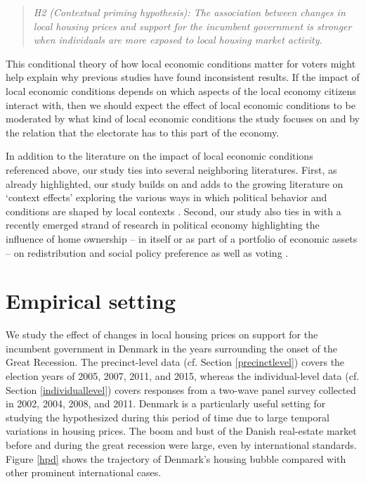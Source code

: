 \documentclass[12pt,a4paper]{article}
\begin{document}
	\newcommand{\htwo}{the contextual priming hypothesis}
	
	\begin{quote}
		\textit{H2 (Contextual priming hypothesis): The association between changes in local housing prices and support for the incumbent government is stronger when individuals are more exposed to local housing market activity.}
	\end{quote}
	
	This conditional theory of how local economic conditions matter for voters might help explain why previous studies have found inconsistent results. If the impact of local economic conditions depends on which aspects of the local economy citizens interact with, then we should expect the effect of local economic conditions to be moderated by what kind of local economic conditions the study focuses on and by the relation that the electorate has to this part of the economy.
	
	In addition to the literature on the impact of local economic conditions referenced above, our study ties into several neighboring literatures. First, as already highlighted, our study builds on and adds to the growing literature on `context effects' exploring the various ways in which political behavior and conditions are shaped by local contexts \citep[e.g.,][]{hopkins2010politicized,enos2016demolition}. Second, our study also ties in with a recently emerged strand of research in political economy highlighting the influence of home ownership -- in itself or as part of a portfolio of economic assets -- on redistribution and social policy preference as well as voting \citep{ansell2014political,nadeau2010patrimonial,stubager2013reaching}.
	
	\section{Empirical setting}
	
	We study the effect of changes in local housing prices on support for the incumbent government in Denmark in the years surrounding the onset of the Great Recession. The precinct-level data (cf. Section \ref{precinctlevel}) covers the election years of 2005, 2007, 2011, and 2015, whereas the individual-level data (cf. Section \ref{individuallevel}) covers responses from a two-wave panel survey collected in 2002, 2004, 2008, and 2011. Denmark is a particularly useful setting for studying the hypothesized during this period of time due to large temporal variations in housing prices. The boom and bust of the Danish real-estate market before and during the great recession were large, even by international standards. Figure \ref{hpd} shows the trajectory of Denmark's housing bubble compared with other prominent international cases.
	
\end{document}
